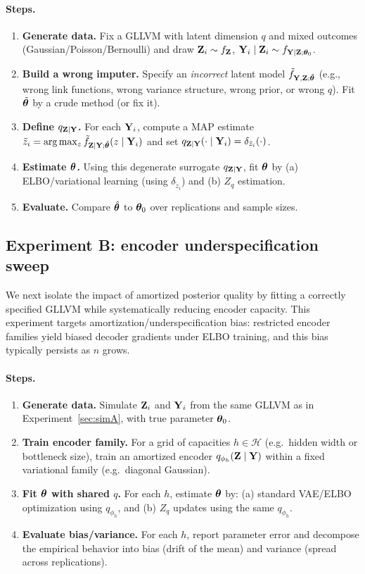 \documentclass[twoside,11pt]{article}
\begin{document}
\paragraph{Steps.}
\begin{enumerate}
\item \textbf{Generate data.} Fix a GLLVM with latent dimension $q$ and mixed outcomes (Gaussian/Poisson/Bernoulli) and draw ${\bf Z}_i \sim f_{\bf Z}$, ${\bf Y}_i\mid {\bf Z}_i \sim f_{{\bf Y}\mid{\bf Z};{\bm{\theta}}_0}$.
\item \textbf{Build a wrong imputer.} Specify an \emph{incorrect} latent model $\tilde f_{{\bf Y},{\bf Z};\tilde{{\bm{\theta}}}}$ (e.g., wrong link functions, wrong variance structure, wrong prior, or wrong $q$). Fit $\tilde{{\bm{\theta}}}$ by a crude method (or fix it).
\item \textbf{Define $q_{{\bf Z}\mid{\bf Y}}$.} For each ${\bf Y}_i$, compute a MAP estimate $\tilde z_i = \arg\max_z \tilde f_{{\bf Z}\mid{\bf Y};\tilde{{\bm{\theta}}}}(z\mid {\bf Y}_i)$ and set $q_{{\bf Z}\mid{\bf Y}}(\cdot\mid {\bf Y}_i)=\delta_{\tilde z_i}(\cdot)$.
\item \textbf{Estimate ${\bm{\theta}}$.} Using this degenerate surrogate $q_{{\bf Z}\mid{\bf Y}}$, fit ${\bm{\theta}}$ by (a) ELBO/variational learning (using $\delta_{\tilde z_i}$) and (b) $Z_q$ estimation.
\item \textbf{Evaluate.} Compare $\hat{{\bm{\theta}}}$ to ${\bm{\theta}}_0$ over replications and sample sizes.
\end{enumerate}


\subsection{Experiment B: encoder underspecification sweep}
\label{sec:simB}

We next isolate the impact of amortized posterior quality by fitting a correctly specified GLLVM while systematically reducing encoder capacity.  This experiment targets amortization/underspecification bias: restricted encoder families yield biased decoder gradients under ELBO training, and this bias typically persists as $n$ grows.

\paragraph{Steps.}
\begin{enumerate}
\item \textbf{Generate data.} Simulate ${\bf Z}_i$ and ${\bf Y}_i$ from the same GLLVM as in Experiment~\ref{sec:simA}, with true parameter ${\bm{\theta}}_0$.
\item \textbf{Train encoder family.} For a grid of capacities $h\in\mathcal H$ (e.g.\ hidden width or bottleneck size), train an amortized encoder $q_{\phi_h}({\bf Z}\mid{\bf Y})$ within a fixed variational family (e.g.\ diagonal Gaussian).
\item \textbf{Fit ${\bm{\theta}}$ with shared $q$.} For each $h$, estimate ${\bm{\theta}}$ by:
(a) standard VAE/ELBO optimization using $q_{\phi_h}$, and
(b) $Z_q$ updates using the same $q_{\phi_h}$.
\item \textbf{Evaluate bias/variance.} For each $h$, report parameter error and decompose the empirical behavior into bias (drift of the mean) and variance (spread across replications).
\end{enumerate}
\end{document}
